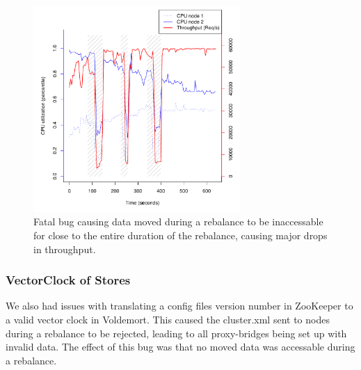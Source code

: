 \begin{figure}[h]
    \centering
    \includegraphics[width=0.7\textwidth]{results/throughput/adaptive/zookeeper/auto_2nodes_error}
    \caption{Fatal bug causing data moved during a rebalance to be inaccessable for close to the entire duration of the rebalance, causing major drops in throughput.}
    \label{fig:adaptive_bug}
\end{figure}

\subsubsection{VectorClock of Stores}
We also had issues with translating a config files version number in ZooKeeper to a valid vector clock in Voldemort. This caused the cluster.xml sent to nodes during a rebalance to be rejected, leading to all proxy-bridges being set up with invalid data. The effect of this bug was that no moved data was accessable during a rebalance. 


